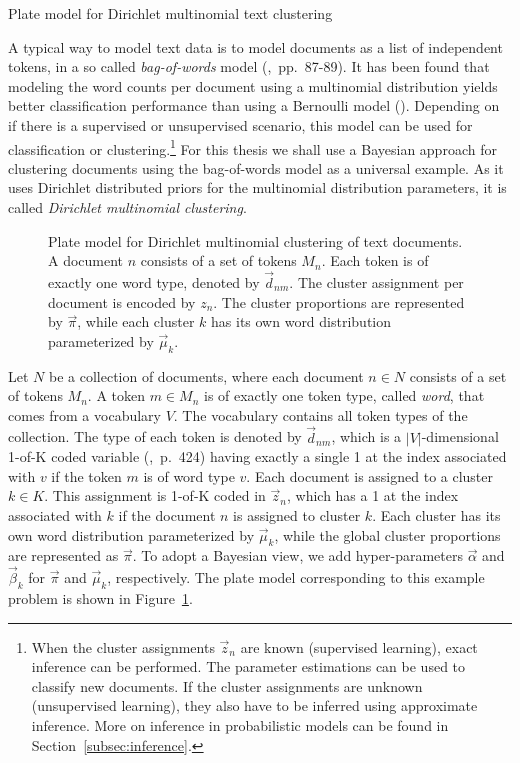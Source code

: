 \begin{Example} Plate model for Dirichlet multinomial text clustering
\label{ex:clustering-pm}

A typical way to model text data is to model documents as a list of independent tokens, in a so called \emph{bag-of-words} model (\cite{murphy2012machine},~pp.~87-89). It has been found that modeling the word counts per document using a multinomial distribution yields better classification performance than using a Bernoulli model (\cite{mccallum1998comparison}). Depending on if there is a supervised or unsupervised scenario, this model can be used for classification or clustering.\footnote{When the cluster assignments $\vec z_n$ are known (supervised learning), exact inference can be performed. The parameter estimations can be used to classify new documents. If the cluster assignments are unknown (unsupervised learning), they also have to be inferred using approximate inference. More on inference in probabilistic models can be found in Section~\ref{subsec:inference}.} For this thesis we shall use a Bayesian approach for clustering documents using the bag-of-words model as a universal example. As it uses Dirichlet distributed priors for the multinomial distribution parameters, it is called \emph{Dirichlet multinomial clustering}.

\begin{figure}[t]
	\begin{center}
    	\scalebox{\tikzScale}{\adjustTikzSize }
	\end{center}
\caption[Plate model for Dirichlet multinomial clustering of text documents]{Plate model for Dirichlet multinomial clustering of text documents. A document $n$ consists of a set of tokens $M_n$. Each token is of exactly one word type, denoted by $\vec d_{nm}$. The cluster assignment per document is encoded by $z_n$. The cluster proportions are represented by $\vec \pi$, while each cluster $k$ has its own word distribution parameterized by $\vec \mu_k$.}
		\label{fig:clustering_platemodel}
\end{figure}

Let $N$ be a collection of documents, where each document $n \in N$ consists of a set of tokens $M_n$. A token $m \in M_n$ is of exactly one token type, called \emph{word}, that comes from a vocabulary $V$. The vocabulary contains all token types of the collection. The type of each token is denoted by $\vec d_{nm}$, which is a $|V|$-dimensional 1-of-K coded variable (\cite{bishop2006pattern},~p.~424) having exactly a single 1 at the index associated with $v$ if the token $m$ is of word type $v$. Each document is assigned to a cluster $k \in K$. This assignment is 1-of-K coded in $\vec z_{n}$, which has a 1 at the index associated with $k$ if the document $n$ is assigned to cluster $k$. Each cluster has its own word distribution parameterized by $\vec \mu_k$, while the global cluster proportions are represented as $\vec \pi$. To adopt a Bayesian view, we add hyper-parameters $\vec \alpha$ and $\vec \beta_k$ for $\vec \pi$ and $\vec \mu_k$, respectively. The plate model corresponding to this example problem is shown in Figure~\ref{fig:clustering_platemodel}.


\end{Example}
